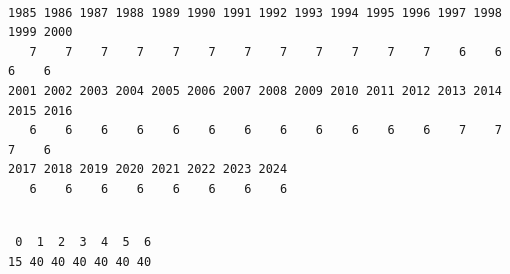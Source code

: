 \documentclass[
  letterpaper,
  oneside,
  open=any]{scrbook}
\newenvironment{Shaded}{\begin{snugshade}}{\end{snugshade}}
\newcommand{\FunctionTok}[1]{\textcolor[rgb]{0.28,0.35,0.67}{#1}}
\newcommand{\NormalTok}[1]{\textcolor[rgb]{0.00,0.23,0.31}{#1}}
\newcommand{\SpecialCharTok}[1]{\textcolor[rgb]{0.37,0.37,0.37}{#1}}
\begin{document}
\begin{verbatim}

1985 1986 1987 1988 1989 1990 1991 1992 1993 1994 1995 1996 1997 1998 1999 2000 
   7    7    7    7    7    7    7    7    7    7    7    7    6    6    6    6 
2001 2002 2003 2004 2005 2006 2007 2008 2009 2010 2011 2012 2013 2014 2015 2016 
   6    6    6    6    6    6    6    6    6    6    6    6    7    7    7    6 
2017 2018 2019 2020 2021 2022 2023 2024 
   6    6    6    6    6    6    6    6 
\end{verbatim}

\begin{Shaded}
\end{Shaded}

\begin{verbatim}

 0  1  2  3  4  5  6 
15 40 40 40 40 40 40 
\end{verbatim}
\end{document}
